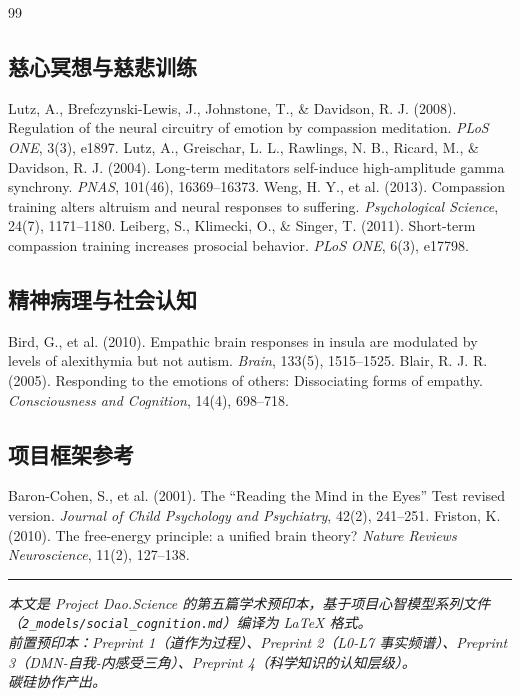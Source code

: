 \documentclass[UTF8,12pt,a4paper]{ctexart}
\begin{document}
\begin{thebibliography}{99}
\subsection*{慈心冥想与慈悲训练}
 Lutz, A., Brefczynski-Lewis, J., Johnstone, T., \& Davidson, R. J. (2008). Regulation of the neural circuitry of emotion by compassion meditation. \textit{PLoS ONE}, 3(3), e1897.
 Lutz, A., Greischar, L. L., Rawlings, N. B., Ricard, M., \& Davidson, R. J. (2004). Long-term meditators self-induce high-amplitude gamma synchrony. \textit{PNAS}, 101(46), 16369--16373.
 Weng, H. Y., et al. (2013). Compassion training alters altruism and neural responses to suffering. \textit{Psychological Science}, 24(7), 1171--1180.
 Leiberg, S., Klimecki, O., \& Singer, T. (2011). Short-term compassion training increases prosocial behavior. \textit{PLoS ONE}, 6(3), e17798.

\subsection*{精神病理与社会认知}
 Bird, G., et al. (2010). Empathic brain responses in insula are modulated by levels of alexithymia but not autism. \textit{Brain}, 133(5), 1515--1525.
 Blair, R. J. R. (2005). Responding to the emotions of others: Dissociating forms of empathy. \textit{Consciousness and Cognition}, 14(4), 698--718.

\subsection*{项目框架参考}
 Baron-Cohen, S., et al. (2001). The ``Reading the Mind in the Eyes'' Test revised version. \textit{Journal of Child Psychology and Psychiatry}, 42(2), 241--251.
 Friston, K. (2010). The free-energy principle: a unified brain theory? \textit{Nature Reviews Neuroscience}, 11(2), 127--138.

\end{thebibliography}

\vspace{1cm}
\noindent\rule{\textwidth}{0.4pt}
\begin{center}
\textit{本文是 Project Dao.Science 的第五篇学术预印本，基于项目心智模型系列文件\\（\texttt{2\_models/social\_cognition.md}）编译为 LaTeX 格式。}\\
\textit{前置预印本：Preprint 1（道作为过程）、Preprint 2（L0-L7 事实频谱）、Preprint 3（DMN-自我-内感受三角）、Preprint 4（科学知识的认知层级）。}\\
\textit{碳硅协作产出。}
\end{center}
\end{document}
